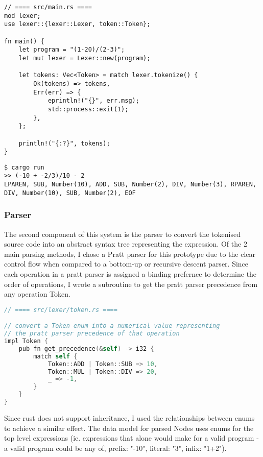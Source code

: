 \begin{lstlisting}
// ==== src/main.rs ====
mod lexer;
use lexer::{lexer::Lexer, token::Token};

fn main() {
    let program = "(1-20)/(2-3)";
    let mut lexer = Lexer::new(program);

    let tokens: Vec<Token> = match lexer.tokenize() {
        Ok(tokens) => tokens,
        Err(err) => {
            eprintln!("{}", err.msg);
            std::process::exit(1);
        },
    };

    println!("{:?}", tokens);
}
\end{lstlisting}

\begin{lstlisting}
$ cargo run
>> (-10 + -2/3)/10 - 2
LPAREN, SUB, Number(10), ADD, SUB, Number(2), DIV, Number(3), RPAREN, DIV, Number(10), SUB, Number(2), EOF
\end{lstlisting}

\subsubsection{Parser}
The second component of this system is the parser to convert the tokenised source code into an abstract syntax tree representing the expression. Of the 2 main parsing methods, I chose a Pratt parser for this prototype due to the clear control flow when compared to a bottom-up or recursive descent parser. Since each operation in a pratt parser is assigned a binding prefernce to determine the order of operations, I wrote a subroutine to get the pratt parser precedence from any operation Token.  

\begin{lstlisting}[language=C]
// ==== src/lexer/token.rs ====

// convert a Token enum into a numerical value representing 
// the pratt parser precedence of that operation
impl Token {
    pub fn get_precedence(&self) -> i32 {
        match self {
            Token::ADD | Token::SUB => 10,
            Token::MUL | Token::DIV => 20,
            _ => -1,
        }
    }
} 
\end{lstlisting}

Since rust does not support inheritance, I used the relationships between enums to achieve a similar effect. The data model for parsed Nodes uses enums for the top level expressions (ie. expressions that alone would make for a valid program - a valid program could be any of, prefix: "-10", literal: "3", infix: "1+2"). 

